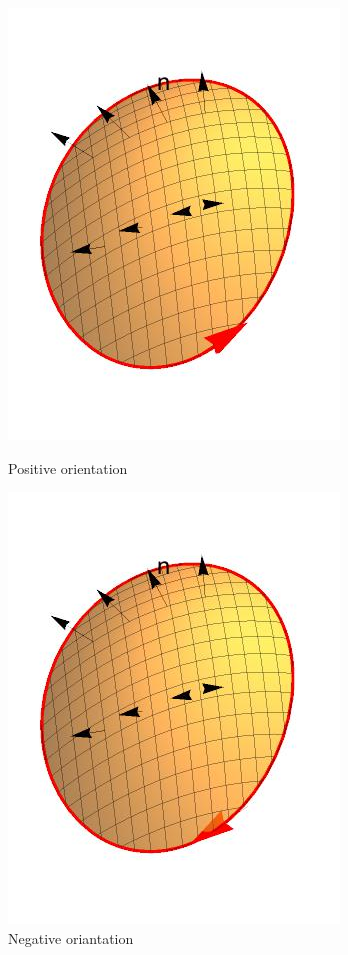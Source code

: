 \documentclass[12pt]{article}
\begin{document}
\begin{figure}[h]
\centering
\parbox{5cm}{
\includegraphics[scale=.4]{right.jpeg}
\caption{Positive orientation}
\label{}}
\qquad
\begin{minipage}{5cm}
\includegraphics[scale=.4]{negative.jpeg}
\caption{Negative oriantation}
\label{fig:2figsB}
\end{minipage}
\end{figure}
\end{document}
